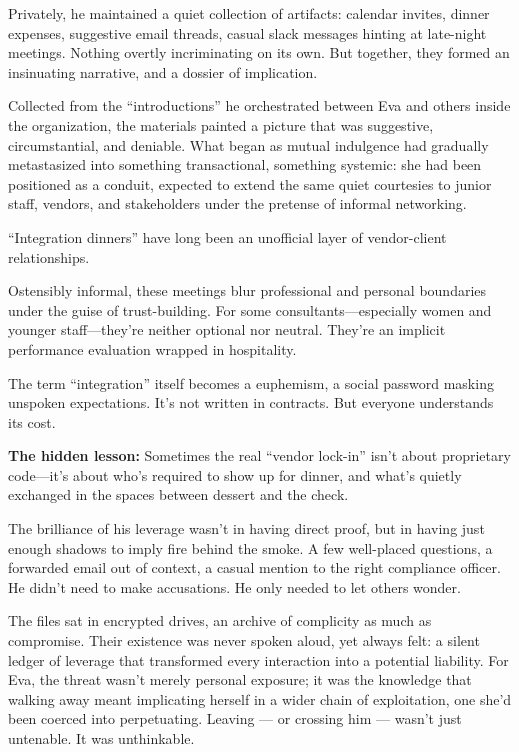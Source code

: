 Privately, he maintained a quiet collection of artifacts: calendar invites, dinner expenses, suggestive email threads, casual slack messages hinting at late-night meetings. Nothing overtly incriminating on its own. But together, they formed an insinuating narrative, and a dossier of implication.

Collected from the “introductions” he orchestrated between Eva and others inside the organization, the materials painted a picture that was suggestive, circumstantial, and deniable. What began as mutual indulgence had gradually metastasized into something transactional, something systemic: she had been positioned as a conduit, expected to extend the same quiet courtesies to junior staff, vendors, and stakeholders under the pretense of informal networking.

\begin{tcolorbox}[title=Behind the Curtain: The Integration Meeting, colback=gray!5, colframe=black, fonttitle=\bfseries]
  ``Integration dinners'' have long been an unofficial layer of vendor-client relationships.

  \medskip

  Ostensibly informal, these meetings blur professional and personal boundaries under the guise of trust-building. For some consultants—especially women and younger staff—they’re neither optional nor neutral. They’re an implicit performance evaluation wrapped in hospitality.

  \medskip

  The term ``integration'' itself becomes a euphemism, a social password masking unspoken expectations. It’s not written in contracts. But everyone understands its cost.

  \medskip

  \textbf{The hidden lesson:} Sometimes the real ``vendor lock-in'' isn’t about proprietary code—it’s about who’s required to show up for dinner, and what’s quietly exchanged in the spaces between dessert and the check.
\end{tcolorbox}

The brilliance of his leverage wasn’t in having direct proof, but in having just enough shadows to imply fire behind the smoke. A few well-placed questions, a forwarded email out of context, a casual mention to the right compliance officer. He didn’t need to make accusations. He only needed to let others wonder.

The files sat in encrypted drives, an archive of complicity as much as compromise. Their existence was never spoken aloud, yet always felt: a silent ledger of leverage that transformed every interaction into a potential liability. For Eva, the threat wasn’t merely personal exposure; it was the knowledge that walking away meant implicating herself in a wider chain of exploitation, one she’d been coerced into perpetuating. Leaving --- or crossing him --- wasn’t just untenable. It was unthinkable.

